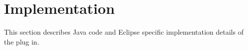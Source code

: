 \section{Implementation}
This section describes Java code and Eclipse specific implementation details
of the plug in.